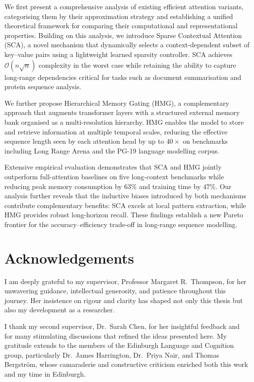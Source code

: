 \documentclass[12pt,a4paper,oneside]{book}
\newcommand{\parsp}[1]{\medskip\noindent#1\medskip}
\begin{document}
\parsp{
  We first present a comprehensive analysis of existing efficient attention variants, categorising
  them by their approximation strategy and establishing a unified theoretical framework for
  comparing their computational and representational properties. Building on this analysis, we
  introduce Sparse Contextual Attention (SCA), a novel mechanism that dynamically selects a
  context-dependent subset of key--value pairs using a lightweight learned sparsity controller.
  SCA achieves $\mathcal{O}(n\sqrt{n})$ complexity in the worst case while retaining the ability
  to capture long-range dependencies critical for tasks such as document summarisation and
  protein sequence analysis.
}

\parsp{
  We further propose Hierarchical Memory Gating (HMG), a complementary approach that augments
  transformer layers with a structured external memory bank organised as a multi-resolution
  hierarchy. HMG enables the model to store and retrieve information at multiple temporal scales,
  reducing the effective sequence length seen by each attention head by up to $40\times$ on
  benchmarks including Long Range Arena and the PG-19 language modelling corpus.
}

\parsp{
  Extensive empirical evaluation demonstrates that SCA and HMG jointly outperform full-attention
  baselines on five long-context benchmarks while reducing peak memory consumption by $63\%$ and
  training time by $47\%$. Our analysis further reveals that the inductive biases introduced by
  both mechanisms contribute complementary benefits: SCA excels at local pattern extraction,
  while HMG provides robust long-horizon recall. These findings establish a new Pareto frontier
  for the accuracy--efficiency trade-off in long-range sequence modelling.
}

\cleardoublepage

\chapter*{Acknowledgements}
\thispagestyle{plain}

I am deeply grateful to my supervisor, Professor Margaret R.\ Thompson, for her unwavering
guidance, intellectual generosity, and patience throughout this journey. Her insistence on
rigour and clarity has shaped not only this thesis but also my development as a researcher.

I thank my second supervisor, Dr.\ Sarah Chen, for her insightful feedback and for many
stimulating discussions that refined the ideas presented here. My gratitude extends to the
members of the Edinburgh Language and Cognition group, particularly Dr.\ James Harrington,
Dr.\ Priya Nair, and Thomas Bergström, whose camaraderie and constructive criticism enriched
both this work and my time in Edinburgh.
\end{document}
